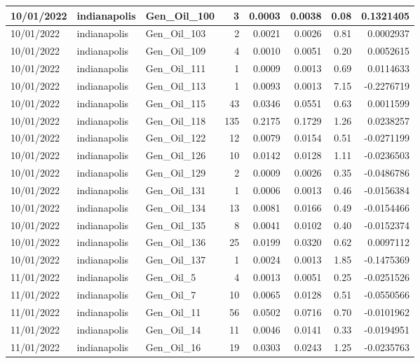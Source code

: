 \documentclass[
  letterpaper,
  DIV=11,
  numbers=noendperiod]{scrartcl}
\begin{document}
\begin{tabular}{l|l|l|r|r|r|r|r}
\hline
10/01/2022 & indianapolis & Gen\_Oil\_100 & 3 & 0.0003 & 0.0038 & 0.08 & 0.1321405\\
\hline
10/01/2022 & indianapolis & Gen\_Oil\_103 & 2 & 0.0021 & 0.0026 & 0.81 & 0.0002937\\
\hline
10/01/2022 & indianapolis & Gen\_Oil\_109 & 4 & 0.0010 & 0.0051 & 0.20 & 0.0052615\\
\hline
10/01/2022 & indianapolis & Gen\_Oil\_111 & 1 & 0.0009 & 0.0013 & 0.69 & 0.0114633\\
\hline
10/01/2022 & indianapolis & Gen\_Oil\_113 & 1 & 0.0093 & 0.0013 & 7.15 & -0.2276719\\
\hline
10/01/2022 & indianapolis & Gen\_Oil\_115 & 43 & 0.0346 & 0.0551 & 0.63 & 0.0011599\\
\hline
10/01/2022 & indianapolis & Gen\_Oil\_118 & 135 & 0.2175 & 0.1729 & 1.26 & 0.0238257\\
\hline
10/01/2022 & indianapolis & Gen\_Oil\_122 & 12 & 0.0079 & 0.0154 & 0.51 & -0.0271199\\
\hline
10/01/2022 & indianapolis & Gen\_Oil\_126 & 10 & 0.0142 & 0.0128 & 1.11 & -0.0236503\\
\hline
10/01/2022 & indianapolis & Gen\_Oil\_129 & 2 & 0.0009 & 0.0026 & 0.35 & -0.0486786\\
\hline
10/01/2022 & indianapolis & Gen\_Oil\_131 & 1 & 0.0006 & 0.0013 & 0.46 & -0.0156384\\
\hline
10/01/2022 & indianapolis & Gen\_Oil\_134 & 13 & 0.0081 & 0.0166 & 0.49 & -0.0154466\\
\hline
10/01/2022 & indianapolis & Gen\_Oil\_135 & 8 & 0.0041 & 0.0102 & 0.40 & -0.0152374\\
\hline
10/01/2022 & indianapolis & Gen\_Oil\_136 & 25 & 0.0199 & 0.0320 & 0.62 & 0.0097112\\
\hline
10/01/2022 & indianapolis & Gen\_Oil\_137 & 1 & 0.0024 & 0.0013 & 1.85 & -0.1475369\\
\hline
11/01/2022 & indianapolis & Gen\_Oil\_5 & 4 & 0.0013 & 0.0051 & 0.25 & -0.0251526\\
\hline
11/01/2022 & indianapolis & Gen\_Oil\_7 & 10 & 0.0065 & 0.0128 & 0.51 & -0.0550566\\
\hline
11/01/2022 & indianapolis & Gen\_Oil\_11 & 56 & 0.0502 & 0.0716 & 0.70 & -0.0101962\\
\hline
11/01/2022 & indianapolis & Gen\_Oil\_14 & 11 & 0.0046 & 0.0141 & 0.33 & -0.0194951\\
\hline
11/01/2022 & indianapolis & Gen\_Oil\_16 & 19 & 0.0303 & 0.0243 & 1.25 & -0.0235763\\

\end{tabular}
\end{document}
